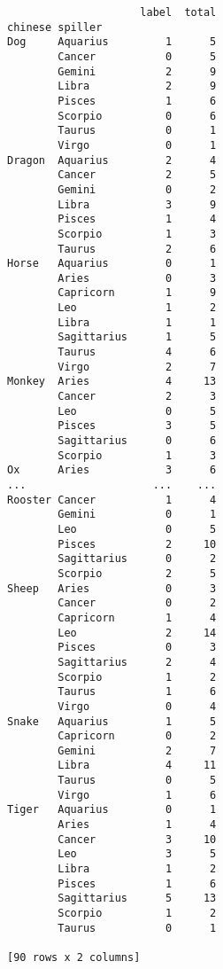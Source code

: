 \documentclass[12pt,fleqn]{article}\usepackage{../common}
\begin{document}
\begin{verbatim}
                     label  total
chinese spiller                  
Dog     Aquarius         1      5
        Cancer           0      5
        Gemini           2      9
        Libra            2      9
        Pisces           1      6
        Scorpio          0      6
        Taurus           0      1
        Virgo            0      1
Dragon  Aquarius         2      4
        Cancer           2      5
        Gemini           0      2
        Libra            3      9
        Pisces           1      4
        Scorpio          1      3
        Taurus           2      6
Horse   Aquarius         0      1
        Aries            0      3
        Capricorn        1      9
        Leo              1      2
        Libra            1      1
        Sagittarius      1      5
        Taurus           4      6
        Virgo            2      7
Monkey  Aries            4     13
        Cancer           2      3
        Leo              0      5
        Pisces           3      5
        Sagittarius      0      6
        Scorpio          1      3
Ox      Aries            3      6
...                    ...    ...
Rooster Cancer           1      4
        Gemini           0      1
        Leo              0      5
        Pisces           2     10
        Sagittarius      0      2
        Scorpio          2      5
Sheep   Aries            0      3
        Cancer           0      2
        Capricorn        1      4
        Leo              2     14
        Pisces           0      3
        Sagittarius      2      4
        Scorpio          1      2
        Taurus           1      6
        Virgo            0      4
Snake   Aquarius         1      5
        Capricorn        0      2
        Gemini           2      7
        Libra            4     11
        Taurus           0      5
        Virgo            1      6
Tiger   Aquarius         0      1
        Aries            1      4
        Cancer           3     10
        Leo              3      5
        Libra            1      2
        Pisces           1      6
        Sagittarius      5     13
        Scorpio          1      2
        Taurus           0      1

[90 rows x 2 columns]
\end{verbatim}
\end{document}
